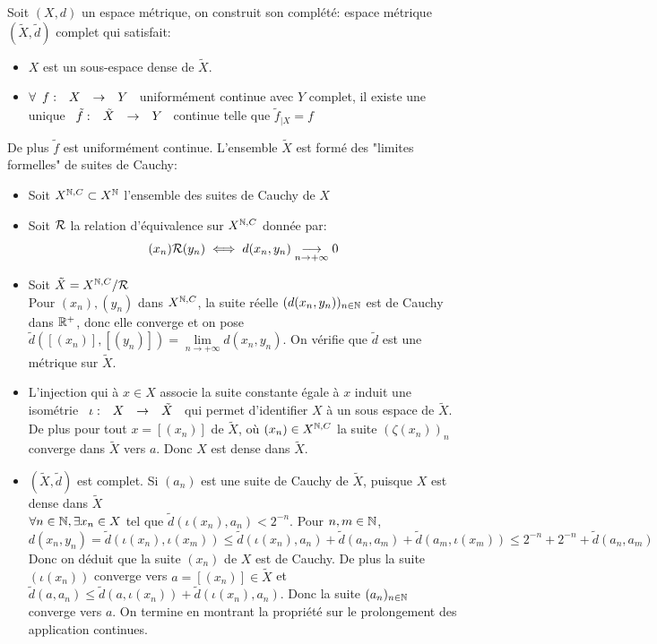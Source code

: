 \documentclass[]{report}
\begin{document}
    Soit $(X,d)$ un espace métrique, on construit son complété: espace métrique $(\tilde{X},\tilde{d})$ complet qui satisfait:
    \begin{itemize}
        \item $X$ est un sous-espace dense de $\tilde{X}$.
        \item $\forall \begin{array}{ccccc} f : & X & \to & Y \end{array}$ uniformément continue avec $Y$ complet, il existe une unique $\begin{array}{ccccc} \tilde{f} : & \tilde{X} & \to & Y \end{array}$ continue telle que $\tilde{f}_{|X}=f$
    \end{itemize}
    De plus $\tilde{f}$ est uniformément continue. L'ensemble $\tilde{X}$ est formé des "limites formelles" de suites de Cauchy:
    \begin{itemize}
        \item Soit $X^{\mathbb{N},C}\subset X^{\mathbb{N}}$ l'ensemble des suites de Cauchy de $X$
        \item Soit $\mathcal{R}$ la relation d'équivalence sur $X^{\mathbb{N},C}$ donnée par:
        \[(x_n)\mathcal{R} (y_n)\iff d(x_n,y_n)\underset{n\to+\infty}{\longrightarrow}0\]
        \item Soit $\tilde{X}=X^{\mathbb{N},C}/\mathcal{R}$\\
        Pour $(x_n),(y_n)$ dans $X^{\mathbb{N},C}$, la suite réelle $(d(x_n,y_n))_{n\in\mathbb{N}}$ est de Cauchy dans $\mathbb{R}^+$, donc elle converge et on pose $\tilde{d}([(x_n)],[(y_n)])=\underset{n\to+\infty}{\lim}d(x_n,y_n)$. On vérifie que $\tilde{d}$ est une métrique sur $\tilde{X}$.
        \item L'injection qui à $x\in X$ associe la suite constante égale à $x$ induit une isométrie $\begin{array}{ccccc} \iota : & X & \to & \tilde{X} \end{array}$ qui permet d'identifier $X$ à un sous espace de $\tilde{X}$. De plus pour tout $x=[(x_n)]$ de $\tilde{X}$, où $(x_n)\in X^{\mathbb{N},C}$ la suite $(\zeta (x_n))_n$ converge dans $\tilde{X}$ vers $a$. Donc $X$ est dense dans $\tilde{X}$.
        \item $(\tilde{X},\tilde{d})$ est complet. Si $(a_n)$ est une suite de Cauchy de $\tilde{X}$, puisque $X$ est dense dans $\tilde{X}$\\
        $\forall {n\in\mathbb{N}},\exists x_n\in X$ tel que $\tilde{d}(\iota(x_n),a_n)<2^{-n}$. Pour $n,m\in \mathbb{N}$,
        \[d(x_n,y_n)=\tilde{d}(\iota(x_n),\iota(x_m))\le \tilde{d}(\iota(x_n),a_n)+\tilde{d}(a_n,a_m)+\tilde{d}(a_m,\iota(x_m))\le 2^{-n}+2^{-n}+\tilde{d}(a_n,a_m)\]
        Donc on déduit que la suite $(x_n)$ de $X$ est de Cauchy. De plus la suite $(\iota(x_n))$ converge vers $a=[(x_n)]\in \tilde{X}$ et $\tilde{d}(a,a_n)\le \tilde{d}(a,\iota(x_n))+\tilde{d}(\iota(x_n),a_n)$. Donc la suite $(a_n)_{n\in\mathbb{N}}$ converge vers $a$. On termine en montrant la propriété sur le prolongement des application continues.
    \end{itemize}
\end{document}

